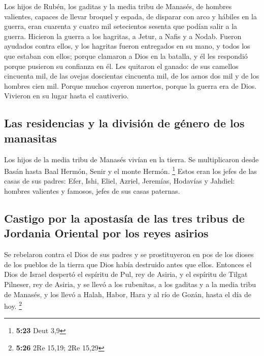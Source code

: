 \begin{paracol}{2}
 Los hijos de Rubén, los gaditas y la media tribu de
Manasés, de hombres valientes, capaces de llevar broquel y espada, de
disparar con arco y hábiles en la guerra, eran cuarenta y cuatro mil
setecientos sesenta que podían salir a la guerra. 
Hicieron la guerra a los hagritas, a Jetur, a Nafis y a Nodab.
 Fueron ayudados contra ellos, y los hagritas fueron
entregados en su mano, y todos los que estaban con ellos; porque
clamaron a Dios en la batalla, y él les respondió porque pusieron su
confianza en él.  Les quitaron el ganado: de sus camellos
cincuenta mil, de las ovejas doscientas cincuenta mil, de los asnos dos
mil y de los hombres cien mil.  Porque muchos cayeron
muertos, porque la guerra era de Dios. Vivieron en su lugar hasta el
cautiverio.

\hypertarget{las-residencias-y-la-divisiuxf3n-de-guxe9nero-de-los-manasitas}{%
\subsection{Las residencias y la división de género de los
manasitas}\label{las-residencias-y-la-divisiuxf3n-de-guxe9nero-de-los-manasitas}}

 Los hijos de la media tribu de Manasés vivían en la
tierra. Se multiplicaron desde Basán hasta Baal Hermón, Senir y el monte
Hermón. \footnote{\textbf{5:23} Deut 3,9}  Estos eran los
jefes de las casas de sus padres: Efer, Ishi, Eliel, Azriel, Jeremías,
Hodavías y Jahdiel: hombres valientes y famosos, jefes de sus casas
paternas.

\hypertarget{castigo-por-la-apostasuxeda-de-las-tres-tribus-de-jordania-oriental-por-los-reyes-asirios}{%
\subsection{Castigo por la apostasía de las tres tribus de Jordania
Oriental por los reyes
asirios}\label{castigo-por-la-apostasuxeda-de-las-tres-tribus-de-jordania-oriental-por-los-reyes-asirios}}

 Se rebelaron contra el Dios de sus padres y se
prostituyeron en pos de los dioses de los pueblos de la tierra que Dios
había destruido antes que ellos.  Entonces el Dios de
Israel despertó el espíritu de Pul, rey de Asiria, y el espíritu de
Tilgat Pilneser, rey de Asiria, y se llevó a los rubenitas, a los
gaditas y a la media tribu de Manasés, y los llevó a Halah, Habor, Hara
y al río de Gozán, hasta el día de hoy. \footnote{\textbf{5:26} 2Re
  15,19; 2Re 15,29}


\end{paracol}
